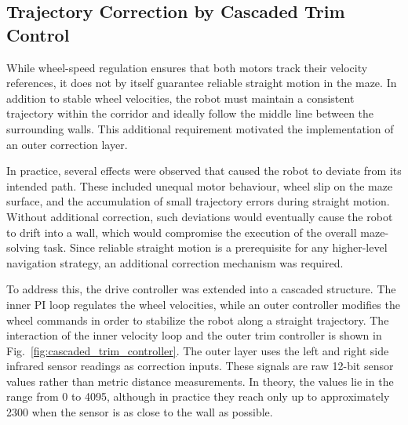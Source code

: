 \subsection{Trajectory Correction by Cascaded Trim Control}

While wheel-speed regulation ensures that both motors track their velocity references, it does not by itself guarantee reliable straight motion in the maze. In addition to stable wheel velocities, the robot must maintain a consistent trajectory within the corridor and ideally follow the middle line between the surrounding walls. This additional requirement motivated the implementation of an outer correction layer.

In practice, several effects were observed that caused the robot to deviate from its intended path. These included unequal motor behaviour, wheel slip on the maze surface, and the accumulation of small trajectory errors during straight motion. Without additional correction, such deviations would eventually cause the robot to drift into a wall, which would compromise the execution of the overall maze-solving task. Since reliable straight motion is a prerequisite for any higher-level navigation strategy, an additional correction mechanism was required.

To address this, the drive controller was extended into a cascaded structure. The inner PI loop regulates the wheel velocities, while an outer controller modifies the wheel commands in order to stabilize the robot along a straight trajectory. The interaction of the inner velocity loop and the outer trim controller is shown in Fig.~\ref{fig:cascaded_trim_controller}. The outer layer uses the left and right side infrared sensor readings as correction inputs\cite{datasheet_sensor}. These signals are raw 12-bit sensor values rather than metric distance measurements. In theory, the values lie in the range from 0 to 4095, although in practice they reach only up to approximately 2300 when the sensor is as close to the wall as possible.

